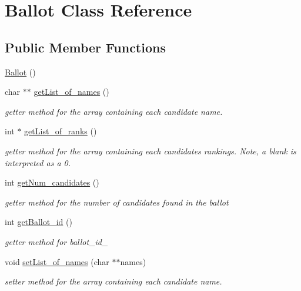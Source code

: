 \hypertarget{classBallot}{}\section{Ballot Class Reference}
\label{classBallot}
\subsection*{Public Member Functions}
\begin{DoxyCompactItemize}
\item 
\hyperlink{classBallot_af9078126260b3f58ea91f6b82797396b}{Ballot} ()
\item 
char $\ast$$\ast$ \hyperlink{classBallot_af4021279872b0181781851a6c06ebd5e}{get\+List\+\_\+of\+\_\+names} ()
\begin{DoxyCompactList}\small\item\em getter method for the array containing each candidate name. \end{DoxyCompactList}\item 
int $\ast$ \hyperlink{classBallot_a05ca0a7c87e67363243a4da0421caf73}{get\+List\+\_\+of\+\_\+ranks} ()
\begin{DoxyCompactList}\small\item\em getter method for the array containing each candidate\textquotesingle{}s rankings. Note, a blank is interpreted as a 0. \end{DoxyCompactList}\item 
int \hyperlink{classBallot_abec0327c6e8fadc5acf2351986706a64}{get\+Num\+\_\+candidates} ()
\begin{DoxyCompactList}\small\item\em getter method for the number of candidates found in the ballot \end{DoxyCompactList}\item 
int \hyperlink{classBallot_a5b9118451032c9f769fdf1b65b10c755}{get\+Ballot\+\_\+id} ()
\begin{DoxyCompactList}\small\item\em getter method for ballot\+\_\+id\+\_\+ \end{DoxyCompactList}\item 
void \hyperlink{classBallot_a0a065a3a5cdf9012240899b5b7d74e34}{set\+List\+\_\+of\+\_\+names} (char $\ast$$\ast$names)
\begin{DoxyCompactList}\small\item\em setter method for the array containing each candidate name. \end{DoxyCompactList}\item 

\end{DoxyCompactItemize}
